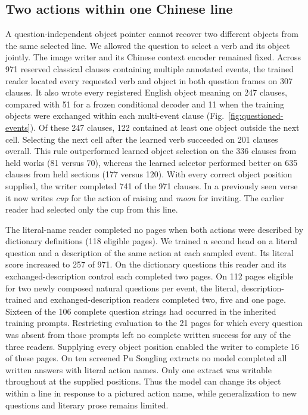 \subsection*{Two actions within one Chinese line}
A question-independent object pointer cannot recover two different objects from the same selected line. We allowed the question to select a verb and its object jointly. The image writer and its Chinese context encoder remained fixed. Across 971 reserved classical clauses containing multiple annotated events, the trained reader located every requested verb and object in both question frames on 307 clauses. It also wrote every registered English object meaning on 247 clauses, compared with 51 for a frozen conditional decoder and 11 when the training objects were exchanged within each multi-event clause (Fig.~\ref{fig:questioned-events}). Of these 247 clauses, 122 contained at least one object outside the next cell. Selecting the next cell after the learned verb succeeded on 201 clauses overall. This rule outperformed learned object selection on the 336 clauses from held works (81 versus 70), whereas the learned selector performed better on 635 clauses from held sections (177 versus 120). With every correct object position supplied, the writer completed 741 of the 971 clauses. In a previously seen verse it now writes \textit{cup} for the action of raising and \textit{moon} for inviting. The earlier reader had selected only the cup from this line.

The literal-name reader completed no pages when both actions were described by dictionary definitions (118 eligible pages). We trained a second head on a literal question and a description of the same action at each sampled event. Its literal score increased to 257 of 971. On the dictionary questions this reader and its exchanged-description control each completed two pages. On 112 pages eligible for two newly composed natural questions per event, the literal, description-trained and exchanged-description readers completed two, five and one page. Sixteen of the 106 complete question strings had occurred in the inherited training prompts. Restricting evaluation to the 21 pages for which every question was absent from those prompts left no complete written success for any of the three readers. Supplying every object position enabled the writer to complete 16 of these pages. On ten screened Pu Songling extracts no model completed all written answers with literal action names. Only one extract was writable throughout at the supplied positions. Thus the model can change its object within a line in response to a pictured action name, while generalization to new questions and literary prose remains limited.
